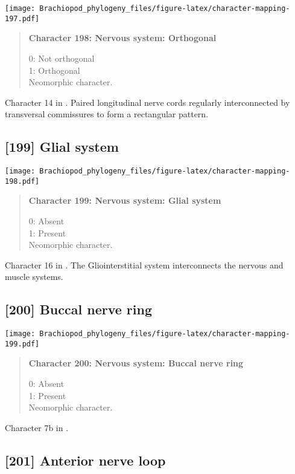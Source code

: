 \documentclass[openany]{book}
\theoremstyle{definition}
\theoremstyle{definition}
\theoremstyle{definition}
\theoremstyle{remark}
\begin{document}
\texttt{[image: Brachiopod\_phylogeny\_files/figure-latex/character-mapping-197.pdf]}

\begin{quote}
\textbf{Character 198: Nervous system: Orthogonal}

0: Not orthogonal\\
1: Orthogonal\\
Neomorphic character.
\end{quote}

Character 14 in \citet{Haszprunar1996}. Paired longitudinal nerve cords
regularly interconnected by transversal commissures to form a
rectangular pattern.

\subsection*{{[}199{]} Glial system}\label{glial-system}

\texttt{[image: Brachiopod\_phylogeny\_files/figure-latex/character-mapping-198.pdf]}

\begin{quote}
\textbf{Character 199: Nervous system: Glial system}

0: Absent\\
1: Present\\
Neomorphic character.
\end{quote}

Character 16 in \citet{Haszprunar1996}. The Gliointerstitial system
interconnects the nervous and muscle systems.

\subsection*{{[}200{]} Buccal nerve ring}\label{buccal-nerve-ring}

\texttt{[image: Brachiopod\_phylogeny\_files/figure-latex/character-mapping-199.pdf]}

\begin{quote}
\textbf{Character 200: Nervous system: Buccal nerve ring}

0: Absent\\
1: Present\\
Neomorphic character.
\end{quote}

Character 7b in \citet{Haszprunar2008}.

\subsection*{{[}201{]} Anterior nerve loop}\label{anterior-nerve-loop}
\end{document}
